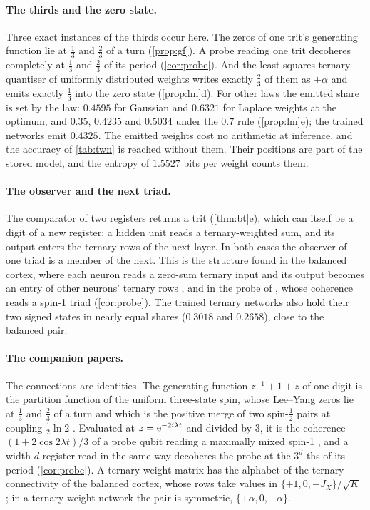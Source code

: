 \documentclass[11pt]{article}
\theoremstyle{definition}\newtheorem{definition}[theorem]{Definition}
\theoremstyle{remark}\newtheorem{remark}[theorem]{Remark}
\begin{document}
\paragraph{The thirds and the zero state.} Three exact instances of the thirds occur here. The zeros of one trit's generating function lie at $\frac13$ and $\frac23$ of a turn (\cref{prop:gf}). A probe reading one trit decoheres completely at $\frac13$ and $\frac23$ of its period (\cref{cor:probe}). And the least-squares ternary quantiser of uniformly distributed weights writes exactly $\frac23$ of them as $\pm\alpha$ and emits exactly $\frac13$ into the zero state (\cref{prop:lm}d). For other laws the emitted share is set by the law: $0.4595$ for Gaussian and $0.6321$ for Laplace weights at the optimum, and $0.35$, $0.4235$ and $0.5034$ under the $0.7$ rule (\cref{prop:lm}e); the trained networks emit $0.4325$. The emitted weights cost no arithmetic at inference, and the accuracy of \cref{tab:twn} is reached without them. Their positions are part of the stored model, and the entropy of $1.5527$ bits per weight counts them.

\paragraph{The observer and the next triad.} The comparator of two registers returns a trit (\cref{thm:bt}e), which can itself be a digit of a new register; a hidden unit reads a ternary-weighted sum, and its output enters the ternary rows of the next layer. In both cases the observer of one triad is a member of the next. This is the structure found in the balanced cortex, where each neuron reads a zero-sum ternary input and its output becomes an entry of other neurons' ternary rows \cite{SNeuro}, and in the probe of \cite{SQuant}, whose coherence reads a spin-1 triad (\cref{cor:probe}). The trained ternary networks also hold their two signed states in nearly equal shares ($0.3018$ and $0.2658$), close to the balanced pair.

\paragraph{The companion papers.} The connections are identities. The generating function $z^{-1}+1+z$ of one digit is the partition function of the uniform three-state spin, whose Lee--Yang zeros lie at $\frac13$ and $\frac23$ of a turn and which is the positive merge of two spin-$\frac12$ pairs at coupling $\frac12\ln2$ \cite{SMath,SQuant}. Evaluated at $z=\mathrm e^{-2i\lambda t}$ and divided by $3$, it is the coherence $(1+2\cos2\lambda t)/3$ of a probe qubit reading a maximally mixed spin-1 \cite{SQuant}, and a width-$d$ register read in the same way decoheres the probe at the $3^d$-ths of its period (\cref{cor:probe}). A ternary weight matrix has the alphabet of the ternary connectivity of the balanced cortex, whose rows take values in $\{+1,0,-J_X\}/\sqrt K$ \cite{SNeuro}; in a ternary-weight network the pair is symmetric, $\{+\alpha,0,-\alpha\}$.
\end{document}
